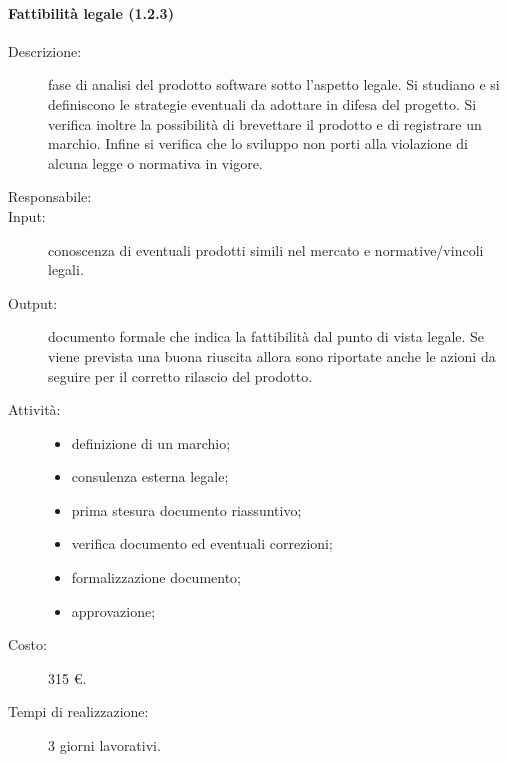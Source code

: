 \paragraph{Fattibilità legale (1.2.3)}
\begin{description}
\item[Descrizione:] fase di analisi del prodotto software sotto l'aspetto legale. Si studiano e si definiscono le strategie eventuali da adottare in difesa del progetto. Si verifica inoltre la possibilità di brevettare il prodotto e di registrare un marchio. Infine si verifica che lo sviluppo non porti alla violazione di alcuna legge o normativa in vigore.
\item[Responsabile:]
\item[Input:] conoscenza di eventuali prodotti simili nel mercato e normative/vincoli legali.
\item[Output:] documento formale che indica la fattibilità dal punto di vista legale. Se viene prevista una buona riuscita allora sono riportate anche le azioni da seguire per il corretto rilascio del prodotto.
\item[Attività:] 
\begin{center}
\begin{itemize}
\item definizione di un marchio;
\item consulenza esterna legale;
\item prima stesura documento riassuntivo;
\item verifica documento ed eventuali correzioni;
\item formalizzazione documento;
\item approvazione;
\end{itemize}
\end{center}
\item[Costo:] 315 \euro{}.
\item[Tempi di realizzazione:] 3 giorni lavorativi.
\end{description}


